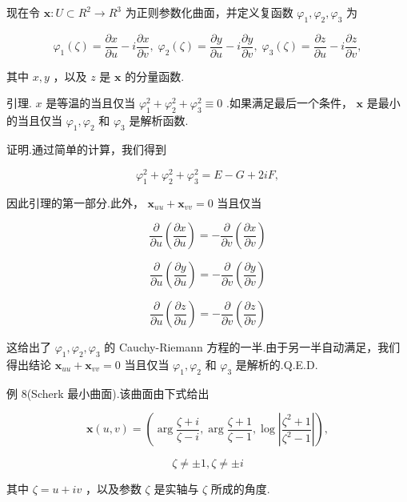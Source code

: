 现在令 \(\mathbf{x} : U \subset  {R}^{2} \rightarrow  {R}^{3}\) 为正则参数化曲面，并定义复函数 \({\varphi }_{1},{\varphi }_{2},{\varphi }_{3}\) 为

\[
{\varphi }_{1}\left( \zeta \right)  = \frac{\partial x}{\partial u} - i\frac{\partial x}{\partial v},\;{\varphi }_{2}\left( \zeta \right)  = \frac{\partial y}{\partial u} - i\frac{\partial y}{\partial v},\;{\varphi }_{3}\left( \zeta \right)  = \frac{\partial z}{\partial u} - i\frac{\partial z}{\partial v},
\]

其中 \(x,y\) ，以及 \(z\) 是 \(\mathbf{x}\) 的分量函数.

引理. \(x\) 是等温的当且仅当 \({\varphi }_{1}^{2} + {\varphi }_{2}^{2} + {\varphi }_{3}^{2} \equiv  0\) .如果满足最后一个条件， \(\mathbf{x}\) 是最小的当且仅当 \({\varphi }_{1},{\varphi }_{2}\) 和 \({\varphi }_{3}\) 是解析函数.

证明.通过简单的计算，我们得到

\[
{\varphi }_{1}^{2} + {\varphi }_{2}^{2} + {\varphi }_{3}^{2} = E - G + {2iF},
\]

因此引理的第一部分.此外， \({\mathbf{x}}_{uu} + {\mathbf{x}}_{vv} = 0\) 当且仅当

\[
\frac{\partial }{\partial u}\left( \frac{\partial x}{\partial u}\right)  =  - \frac{\partial }{\partial v}\left( \frac{\partial x}{\partial v}\right)
\]

\[
\frac{\partial }{\partial u}\left( \frac{\partial y}{\partial u}\right)  =  - \frac{\partial }{\partial v}\left( \frac{\partial y}{\partial v}\right)
\]

\[
\frac{\partial }{\partial u}\left( \frac{\partial z}{\partial u}\right)  =  - \frac{\partial }{\partial v}\left( \frac{\partial z}{\partial v}\right)
\]

这给出了 \({\varphi }_{1},{\varphi }_{2},{\varphi }_{3}\) 的 Cauchy-Riemann 方程的一半.由于另一半自动满足，我们得出结论 \({\mathbf{x}}_{uu} + {\mathbf{x}}_{vv} = 0\) 当且仅当 \({\varphi }_{1},{\varphi }_{2}\) 和 \({\varphi }_{3}\) 是解析的.Q.E.D.

例 8(Scherk 最小曲面).该曲面由下式给出

\[
\mathbf{x}\left( {u,v}\right)  = \left( {\arg \frac{\zeta  + i}{\zeta  - i},\arg \frac{\zeta  + 1}{\zeta  - 1},\log \left| \frac{{\zeta }^{2} + 1}{{\zeta }^{2} - 1}\right| }\right) ,
\]

\[
\zeta  \neq   \pm  1,\zeta  \neq   \pm  i
\]

其中 \(\zeta  = u + {iv}\) ，以及参数 \(\zeta\) 是实轴与 \(\zeta\) 所成的角度.

